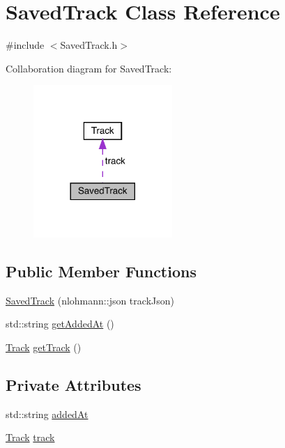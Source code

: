 \hypertarget{class_saved_track}{}\section{Saved\+Track Class Reference}
\label{class_saved_track}


{\ttfamily \#include $<$Saved\+Track.\+h$>$}



Collaboration diagram for Saved\+Track\+:
\nopagebreak
\begin{figure}[H]
\begin{center}
\leavevmode
\includegraphics[width=149pt]{class_saved_track__coll__graph}
\end{center}
\end{figure}
\subsection*{Public Member Functions}
\begin{DoxyCompactItemize}
\item 
\mbox{\hyperlink{class_saved_track_aee98494de0777a97eecba292ac1ae1af}{Saved\+Track}} (nlohmann\+::json track\+Json)
\item 
std\+::string \mbox{\hyperlink{class_saved_track_afc0b96082927d83e5bddc48754fe2b8f}{get\+Added\+At}} ()
\item 
\mbox{\hyperlink{class_track}{Track}} \mbox{\hyperlink{class_saved_track_a604669cef47c5bf733995b4cab36b19c}{get\+Track}} ()
\end{DoxyCompactItemize}
\subsection*{Private Attributes}
\begin{DoxyCompactItemize}
\item 
std\+::string \mbox{\hyperlink{class_saved_track_a2f273169cdc5c067483e7de31e1a9767}{added\+At}}
\item 
\mbox{\hyperlink{class_track}{Track}} \mbox{\hyperlink{class_saved_track_a6a3eb68432e4a47b05e68bc748594577}{track}}
\end{DoxyCompactItemize}


